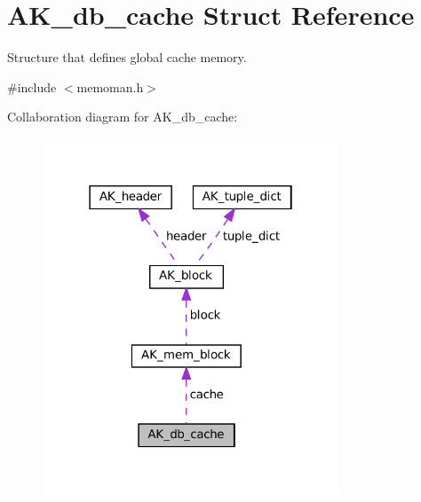 \hypertarget{structAK__db__cache}{}\section{A\+K\+\_\+db\+\_\+cache Struct Reference}
\label{structAK__db__cache}


Structure that defines global cache memory.  




{\ttfamily \#include $<$memoman.\+h$>$}



Collaboration diagram for A\+K\+\_\+db\+\_\+cache\+:\nopagebreak
\begin{figure}[H]
\begin{center}
\leavevmode
\includegraphics[width=250pt]{structAK__db__cache__coll__graph}
\end{center}
\end{figure}

